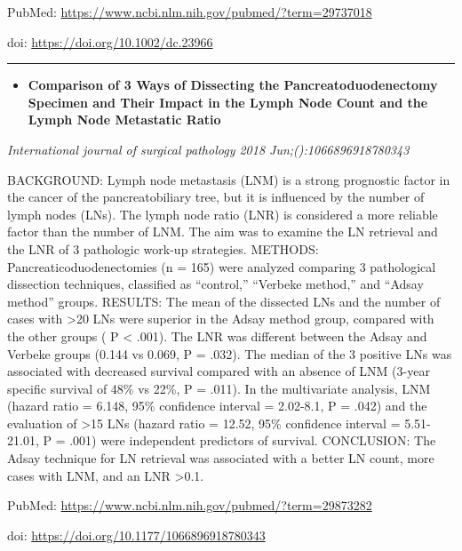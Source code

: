 \documentclass[]{article}
\providecommand{\tightlist}{%
  \setlength{\itemsep}{0pt}\setlength{\parskip}{0pt}}
\begin{document}
PubMed: \url{https://www.ncbi.nlm.nih.gov/pubmed/?term=29737018}

doi: \url{https://doi.org/10.1002/dc.23966}

{}

{}

\begin{center}\rule{0.5\linewidth}{\linethickness}\end{center}

\begin{itemize}
\tightlist
\item
  \textbf{Comparison of 3 Ways of Dissecting the Pancreatoduodenectomy
  Specimen and Their Impact in the Lymph Node Count and the Lymph Node
  Metastatic Ratio}
\end{itemize}

\emph{International journal of surgical pathology 2018
Jun;():1066896918780343}

BACKGROUND: Lymph node metastasis (LNM) is a strong prognostic factor in
the cancer of the pancreatobiliary tree, but it is influenced by the
number of lymph nodes (LNs). The lymph node ratio (LNR) is considered a
more reliable factor than the number of LNM. The aim was to examine the
LN retrieval and the LNR of 3 pathologic work-up strategies. METHODS:
Pancreaticoduodenectomies (n = 165) were analyzed comparing 3
pathological dissection techniques, classified as ``control,'' ``Verbeke
method,'' and ``Adsay method'' groups. RESULTS: The mean of the
dissected LNs and the number of cases with \textgreater{}20 LNs were
superior in the Adsay method group, compared with the other groups ( P
\textless{} .001). The LNR was different between the Adsay and Verbeke
groups (0.144 vs 0.069, P = .032). The median of the 3 positive LNs was
associated with decreased survival compared with an absence of LNM
(3-year specific survival of 48\% vs 22\%, P = .011). In the
multivariate analysis, LNM (hazard ratio = 6.148, 95\% confidence
interval = 2.02-8.1, P = .042) and the evaluation of \textgreater{}15
LNs (hazard ratio = 12.52, 95\% confidence interval = 5.51-21.01, P =
.001) were independent predictors of survival. CONCLUSION: The Adsay
technique for LN retrieval was associated with a better LN count, more
cases with LNM, and an LNR \textgreater{}0.1.

PubMed: \url{https://www.ncbi.nlm.nih.gov/pubmed/?term=29873282}

doi: \url{https://doi.org/10.1177/1066896918780343}

{}

{}
\end{document}
